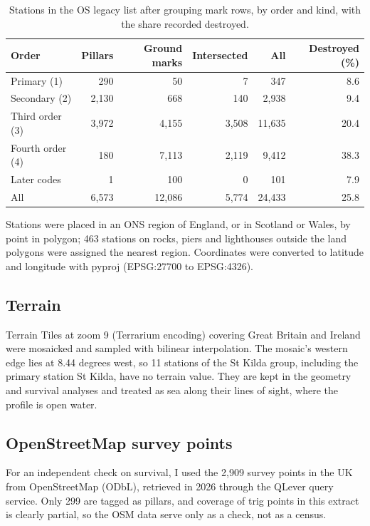 \documentclass[11pt,a4paper]{article}
\begin{document}
\begin{table}[tbp]\centering\small\caption{Stations in the OS legacy list after grouping mark rows, by order and kind, with the share recorded destroyed.}\label{tab:stations}\begin{tabular}{lrrrrr}\toprule Order & Pillars & Ground marks & Intersected & All & Destroyed (\%)\\\midrule
Primary (1) & 290 & 50 & 7 & 347 & 8.6\\
Secondary (2) & 2,130 & 668 & 140 & 2,938 & 9.4\\
Third order (3) & 3,972 & 4,155 & 3,508 & 11,635 & 20.4\\
Fourth order (4) & 180 & 7,113 & 2,119 & 9,412 & 38.3\\
Later codes & 1 & 100 & 0 & 101 & 7.9\\
\midrule All & 6,573 & 12,086 & 5,774 & 24,433 & 25.8\\
\bottomrule\end{tabular}\end{table}

Stations were placed in an ONS region of England, or in Scotland or Wales, by point in polygon; 463 stations on rocks, piers and lighthouses outside the land polygons were assigned the nearest region. Coordinates were converted to latitude and longitude with pyproj (EPSG:27700 to EPSG:4326).

\subsection{Terrain}
Terrain Tiles at zoom 9 (Terrarium encoding) covering Great Britain and Ireland were mosaicked and sampled with bilinear interpolation. The mosaic's western edge lies at 8.44 degrees west, so 11 stations of the St Kilda group, including the primary station St Kilda, have no terrain value. They are kept in the geometry and survival analyses and treated as sea along their lines of sight, where the profile is open water.

\subsection{OpenStreetMap survey points}
For an independent check on survival, I used the 2,909 survey points in the UK from OpenStreetMap (ODbL), retrieved in 2026 through the QLever query service. Only 299 are tagged as pillars, and coverage of trig points in this extract is clearly partial, so the OSM data serve only as a check, not as a census.
\end{document}
